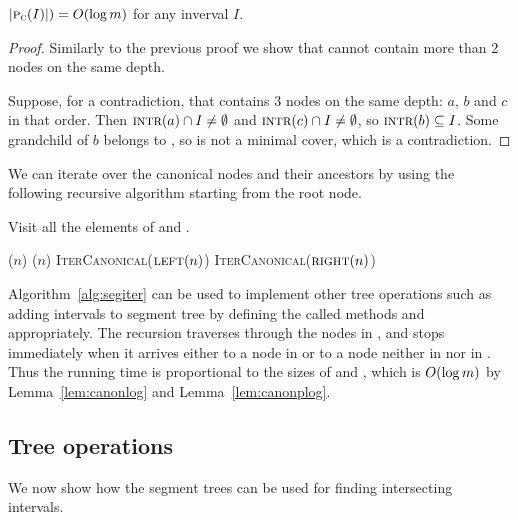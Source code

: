 \documentclass[english,gradu]{tktltiki2018}
\begin{document}
\begin{lem}\label{lem:canonplog}$\left |\textsc{p}_{\textsc{c}}(I)\right |)=O(\log m)$ for any inverval $I$.\end{lem}
\begin{proof}
Similarly to the previous proof we show that  cannot contain more than 2 nodes on the same depth.

Suppose, for a contradiction, that  contains 3 nodes on the same depth: $a$, $b$ and $c$ in that order.
Then $\textsc{intr}(a)\cap I\neq\emptyset$ and $\textsc{intr}(c)\cap I\neq\emptyset$, so $\textsc{intr}(b)\subseteq I$.
Some grandchild of $b$ belongs to , so  is not a minimal cover, which is a contradiction.
\end{proof}

We can iterate over the canonical nodes and their ancestors by using the following recursive algorithm starting from the root node.

\begin{alg}\label{alg:segiter}
Visit all the elements of  and .
\begin{algorithmic}
		\State \visitc($n$)
		\State \visitp($n$)
		\State \textsc{IterCanonical}($\textsc{left}(n)$)
		\State \textsc{IterCanonical}($\textsc{right}(n)$)
	\EndIf
\EndProcedure
\end{algorithmic}
\end{alg}

Algorithm~\ref{alg:segiter} can be used to implement other tree operations such as adding intervals to segment tree by defining the called methods \visitc and \visitp appropriately.
The recursion traverses through the nodes in , and stops immediately when it arrives either to a node in  or to a node neither in  nor in .
Thus the running time is proportional to the sizes of  and , which is $O(\log m)$ by Lemma~\ref{lem:canonlog} and Lemma~\ref{lem:canonplog}.

\subsection{Tree operations}\label{sec:treeops}

We now show how the segment trees can be used for finding intersecting intervals.
\end{document}
